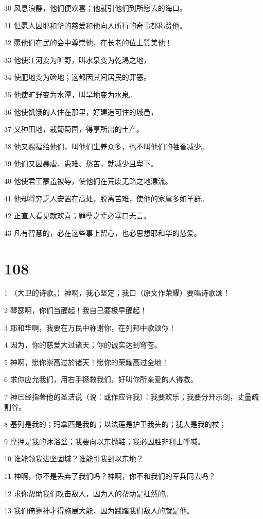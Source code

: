 \par 30 风息浪静，他们便欢喜；他就引他们到所愿去的海口。
\par 31 但愿人因耶和华的慈爱和他向人所行的奇事都称赞他。
\par 32 愿他们在民的会中尊崇他，在长老的位上赞美他！
\par 33 他使江河变为旷野，叫水泉变为乾渴之地，
\par 34 使肥地变为硷地；这都因其间居民的罪恶。
\par 35 他使旷野变为水潭，叫旱地变为水泉。
\par 36 他使饥饿的人住在那里，好建造可住的城邑，
\par 37 又种田地，栽葡萄园，得享所出的土产。
\par 38 他又赐福给他们，叫他们生养众多，也不叫他们的牲畜减少。
\par 39 他们又因暴虐、患难、愁苦，就减少且卑下。
\par 40 他使君王蒙羞被辱，使他们在荒废无路之地漂流。
\par 41 他却将穷乏人安置在高处，脱离苦难，使他的家属多如羊群。
\par 42 正直人看见就欢喜；罪孽之辈必塞口无言。
\par 43 凡有智慧的，必在这些事上留心，也必思想耶和华的慈爱。

\chapter{108}

\par 1 （大卫的诗歌。）神啊，我心坚定；我口（原文作荣耀）要唱诗歌颂！
\par 2 琴瑟啊，你们当醒起！我自己要极早醒起！
\par 3 耶和华啊，我要在万民中称谢你，在列邦中歌颂你！
\par 4 因为，你的慈爱大过诸天；你的诚实达到穹苍。
\par 5 神啊，愿你崇高过於诸天！愿你的荣耀高过全地！
\par 6 求你应允我们，用右手拯救我们，好叫你所亲爱的人得救。
\par 7 神已经指著他的圣洁说（说：或作应许我）：我要欢乐；我要分开示剑，丈量疏割谷。
\par 8 基列是我的；玛拿西是我的；以法莲是护卫我头的；犹大是我的杖；
\par 9 摩押是我的沐浴盆；我要向以东抛鞋；我必因胜非利士呼喊。
\par 10 谁能领我进坚固城？谁能引我到以东地？
\par 11 神啊，你不是丢弃了我们吗？神啊，你不和我们的军兵同去吗？
\par 12 求你帮助我们攻击敌人，因为人的帮助是枉然的。
\par 13 我们倚靠神才得施展大能，因为践踏我们敌人的就是他。

